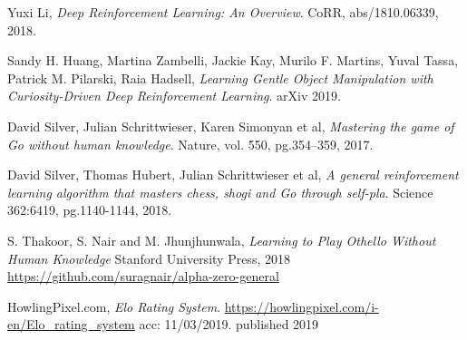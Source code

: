 \documentclass[../main.tex]{subfiles}
\begin{document}
\begin{thebibliography}{9}
        Yuxi Li, 
        \emph{Deep Reinforcement Learning: An Overview}. 
        CoRR, abs/1810.06339, 2018.
    
        Sandy H. Huang, Martina Zambelli, Jackie Kay, Murilo F. Martins, Yuval Tassa, Patrick M. Pilarski, Raia Hadsell,
        \emph{Learning Gentle Object Manipulation with Curiosity-Driven Deep Reinforcement Learning}.
        arXiv 2019.

        David Silver, Julian Schrittwieser, Karen Simonyan et al,
        \emph{Mastering the game of Go without human knowledge}.
        Nature, vol. 550, pg.354–359, 2017.
    
        David Silver, Thomas Hubert, Julian Schrittwieser et al, 
        \emph{A general reinforcement learning algorithm that
        masters chess, shogi and Go through self-pla}.
        Science 362:6419, pg.1140-1144, 2018.

        S. Thakoor, S. Nair and M. Jhunjhunwala,
        \emph{Learning to Play Othello Without Human Knowledge}
        Stanford University Press, 2018
        \url{https://github.com/suragnair/alpha-zero-general}

        HowlingPixel.com,
        \emph{Elo Rating System}.
        \url{https://howlingpixel.com/i-en/Elo_rating_system}
        acc: 11/03/2019. published 2019
    
\end{thebibliography}
\end{document}
